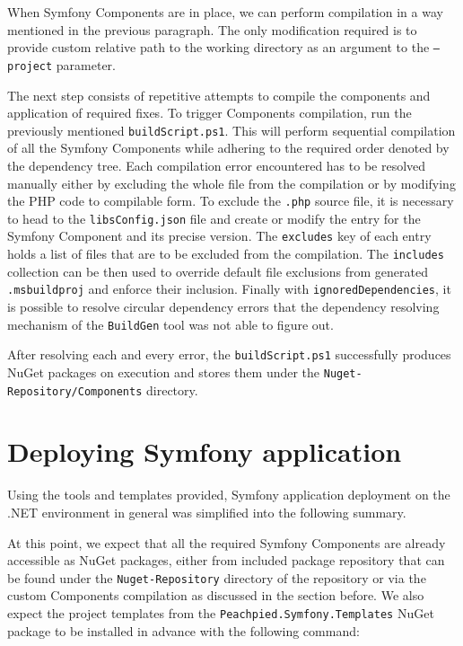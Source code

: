 When Symfony Components are in place, we can perform compilation in a way mentioned in the previous paragraph. The only modification required is to provide custom relative path to the working directory as an argument to the \texttt{--project} parameter. 

The next step consists of repetitive attempts to compile the components and application of required fixes. To trigger Components compilation, run the previously mentioned \texttt{buildScript.ps1}. This will perform sequential compilation of all the Symfony Components while adhering to the required order denoted by the dependency tree. Each compilation error encountered has to be resolved manually either by excluding the whole file from the compilation or by modifying the PHP code to compilable form. To exclude the \texttt{.php} source file, it is necessary to head to the \texttt{libsConfig.json} file and create or modify the entry for the Symfony Component and its precise version. The \texttt{excludes} key of each entry holds a list of files that are to be excluded from the compilation. The \texttt{includes} collection can be then used to override default file exclusions from generated \texttt{.msbuildproj} and enforce their inclusion. Finally with \texttt{ignoredDependencies}, it is possible to resolve circular dependency errors that the dependency resolving mechanism of the \texttt{BuildGen} tool was not able to figure out.

After resolving each and every error, the \texttt{buildScript.ps1} successfully produces NuGet packages on execution and stores them under the \texttt{Nuget-Repository/Components} directory.


\section{Deploying Symfony application}
Using the tools and templates provided, Symfony application deployment on the .NET environment in general was simplified into the following summary.

At this point, we expect that all the required Symfony Components are already accessible as NuGet packages, either from included package repository that can be found under the \texttt{Nuget-Repository} directory of the repository or via the custom Components compilation as discussed in the section before. We also expect the project templates from the \texttt{Peachpied.Symfony.Templates} NuGet package to be installed in advance with the following command: \noindent{}

